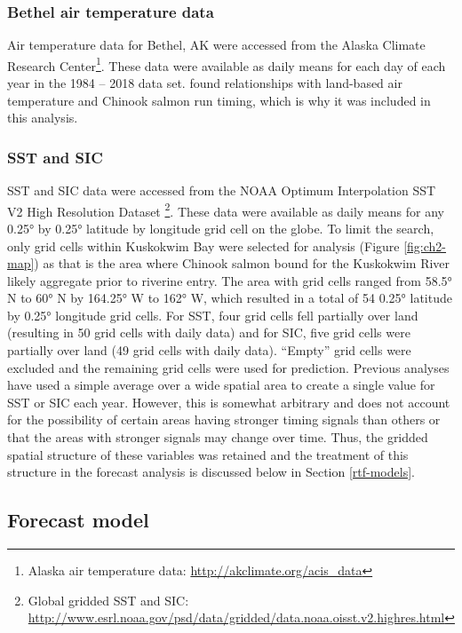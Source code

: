 \documentclass[12pt,]{book}
\let\rmarkdownfootnote\footnote%
\def\footnote{\protect\rmarkdownfootnote}
\theoremstyle{definition}
\theoremstyle{definition}
\theoremstyle{definition}
\theoremstyle{remark}
\begin{document}
\subsubsection{Bethel air temperature
data}\label{bethel-air-temperature-data}

\noindent
Air temperature data for Bethel, AK were accessed from the Alaska
Climate Research Center\footnote{Alaska air temperature data:
  \url{http://akclimate.org/acis_data}}. These data were available as
daily means for each day of each year in the 1984 -- 2018 data set.
\citet{mundy-evenson-2011} found relationships with land-based air
temperature and Chinook salmon run timing, which is why it was included
in this analysis.

\subsubsection{SST and SIC}\label{sst-and-sic}

\noindent
SST and SIC data were accessed from the NOAA Optimum Interpolation SST
V2 High Resolution Dataset \citep{reynolds-etal-2007}\footnote{Global
  gridded SST and SIC:
  \url{http://www.esrl.noaa.gov/psd/data/gridded/data.noaa.oisst.v2.highres.html}}.
These data were available as daily means for any 0.25° by 0.25° latitude
by longitude grid cell on the globe. To limit the search, only grid
cells within Kuskokwim Bay were selected for analysis (Figure
\ref{fig:ch2-map}) as that is the area where Chinook salmon bound for
the Kuskokwim River likely aggregate prior to riverine entry. The area
with grid cells ranged from 58.5° N to 60° N by 164.25° W to 162° W,
which resulted in a total of 54 0.25° latitude by 0.25° longitude grid
cells. For SST, four grid cells fell partially over land (resulting in
50 grid cells with daily data) and for SIC, five grid cells were
partially over land (49 grid cells with daily data). ``Empty'' grid
cells were excluded and the remaining grid cells were used for
prediction. Previous analyses have used a simple average over a wide
spatial area \citep[e.g.,][]{mundy-evenson-2011} to create a single
value for SST or SIC each year. However, this is somewhat arbitrary and
does not account for the possibility of certain areas having stronger
timing signals than others or that the areas with stronger signals may
change over time. Thus, the gridded spatial structure of these variables
was retained and the treatment of this structure in the forecast
analysis is discussed below in Section \ref{rtf-models}.

\subsection{Forecast model}\label{reg-models}
\end{document}
